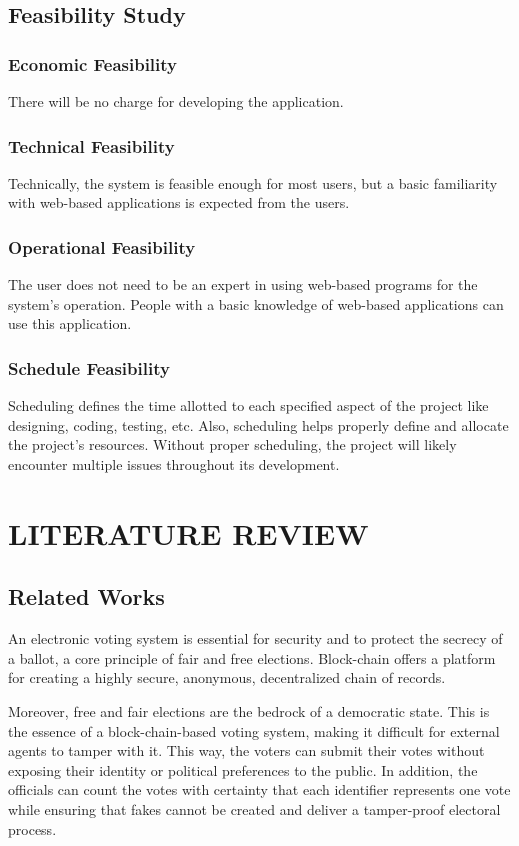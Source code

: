 \documentclass[a4paper,12pt]{report}
\begin{document}
\section{Feasibility Study}


\subsection{Economic Feasibility}
There will be no charge for developing the application.  
 
\subsection{Technical Feasibility}
Technically, the system is feasible enough for most users, but a basic familiarity with web-based applications is expected from the users.

\subsection{Operational Feasibility}
The user does not need to be an expert in using web-based programs for the system's operation. People with a basic knowledge of web-based applications can use this application.

\subsection{Schedule Feasibility}
Scheduling defines the time allotted to each specified aspect of the project like designing, coding, testing, etc. Also, scheduling helps properly define and allocate the project's resources. Without proper scheduling, the project will likely encounter multiple issues throughout its development.

\chapter{LITERATURE REVIEW}
\section{Related Works}
An electronic voting system is essential for security and to protect the secrecy of a ballot, a core principle of fair and free elections. Block-chain offers a platform for creating a highly secure, anonymous, decentralized chain of records.

Moreover, free and fair elections are the bedrock of a democratic state. This is the essence of a block-chain-based voting system, making it difficult for external agents to tamper with it. This way, the voters can submit their votes without exposing their identity or political preferences to the public. In addition, the officials can count the votes with certainty that each identifier represents one vote while ensuring that fakes cannot be created and deliver a tamper-proof electoral process.
\end{document}
